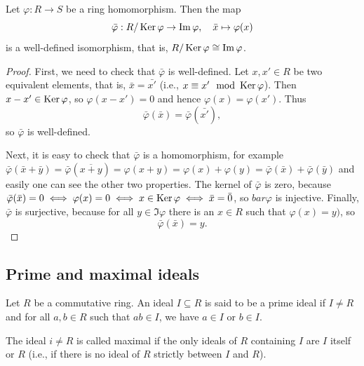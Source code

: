 \documentclass[10pt, a4paper]{article}
\begin{document}
\begin{theorem}[FIT]
    Let $\varphi : R \to S$ be a ring homomorphism.
    Then the map
    \[
    \bar{\varphi} : R / \operatorname{Ker}{\varphi} \to \mathrm{Im}\,{\varphi},\quad \bar{x} \mapsto \varphi(x)
    \]
    is a well-defined isomorphism,
    that is,
    $R / \operatorname{Ker}{\varphi} \cong \mathrm{Im}\,{\varphi}$.

    \begin{proof}
        First,
        we need to check that $\bar{\varphi}$ is well-defined.
        Let $x, x' \in R$ be two equivalent elements,
        that is,
        $\bar{x} = \bar{x'}$
        (i.e.,
        $x \equiv x'\mod{\operatorname{Ker}{\varphi}}$).
        Then $x - x' \in \operatorname{Ker}{\varphi}$,
        so $\varphi(x - x') = 0$ and hence $\varphi(x) = \varphi(x')$.
        Thus
        \[
        \bar{\varphi}(\bar{x}) = \bar{\varphi}(\bar{x'}),
        \]
        so $\bar{\varphi}$ is well-defined.


        Next,
        it is easy to check that $\bar{\varphi}$ is a homomorphism,
        for example $\bar{\varphi}(\bar{x} + \bar{y}) = \bar{\varphi}(\overline{x + y}) = \varphi(x + y) = \varphi(x) + \varphi(y) = \bar{\varphi}(\bar{x}) + \bar{\varphi}(\bar{y})$ and easily one can see the other two properties.
        The kernel of $\bar{\varphi}$ is zero,
        because $\bar{\varphi}(\bar{x}) = 0 \iff \varphi(x) = 0 \iff x \in \operatorname{Ker}{\varphi} \iff \bar{x} = \bar{0}$,
        so $bar{\varphi}$ is injective.
        Finally,
        $\bar{\varphi}$ is surjective,
        because for all $y \in \Im{\varphi}$ there is an $x \in R$ such that $\varphi(x) = y)$,
        so
        \[
        \bar{\varphi}(\bar{x}) = y.
        \]
    \end{proof}
\end{theorem}

\subsection{Prime and maximal ideals}

\begin{definition}
    Let $R$ be a commutative ring.
    An ideal $I \subseteq R$ is said to be a prime ideal if $I \neq R$ and for all $a, b \in R$ such that $ab \in I$,
    we have $a \in I$ or $b \in I$.

    The ideal $i \neq R$ is called maximal if the only ideals of $R$ containing $I$ are $I$ itself or $R$
    (i.e.,
    if there is no ideal of $R$ strictly between $I$ and $R$).
\end{definition}
\end{document}
